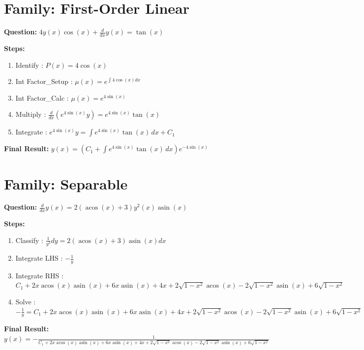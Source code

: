 \documentclass{article}
\begin{document}
\section*{Family: First-Order Linear}
\textbf{Question:} $4 y{\left(x \right)} \cos{\left(x \right)} + \frac{d}{d x} y{\left(x \right)} = \tan{\left(x \right)}$

\textbf{Steps:}
\begin{enumerate}
\item Identify :  $P(x) = 4 \cos{\left(x \right)}$
\item Int Factor_Setup :  $\mu(x) = e^{\int 4 \cos{\left(x \right)} dx}$
\item Int Factor_Calc :  $\mu(x) = e^{4 \sin{\left(x \right)}}$
\item Multiply :  $\frac{d}{dx}(e^{4 \sin{\left(x \right)}}y) = e^{4 \sin{\left(x \right)}} \tan{\left(x \right)}$
\item Integrate :  $e^{4 \sin{\left(x \right)}}y = \int e^{4 \sin{\left(x \right)}} \tan{\left(x \right)}\, dx + C_1$
\end{enumerate}
\textbf{Final Result:} $y{\left(x \right)} = \left(C_{1} + \int e^{4 \sin{\left(x \right)}} \tan{\left(x \right)}\, dx\right) e^{- 4 \sin{\left(x \right)}}$

\section*{Family: Separable}
\textbf{Question:} $\frac{d}{d x} y{\left(x \right)} = 2 \left(\operatorname{acos}{\left(x \right)} + 3\right) y^{2}{\left(x \right)} \operatorname{asin}{\left(x \right)}$

\textbf{Steps:}
\begin{enumerate}
\item Classify :  $\frac{1}{y^{2}} dy = 2 \left(\operatorname{acos}{\left(x \right)} + 3\right) \operatorname{asin}{\left(x \right)} dx$
\item Integrate LHS :  $- \frac{1}{y}$
\item Integrate RHS :  $C_{1} + 2 x \operatorname{acos}{\left(x \right)} \operatorname{asin}{\left(x \right)} + 6 x \operatorname{asin}{\left(x \right)} + 4 x + 2 \sqrt{1 - x^{2}} \operatorname{acos}{\left(x \right)} - 2 \sqrt{1 - x^{2}} \operatorname{asin}{\left(x \right)} + 6 \sqrt{1 - x^{2}}$
\item Solve :  $- \frac{1}{y} = C_{1} + 2 x \operatorname{acos}{\left(x \right)} \operatorname{asin}{\left(x \right)} + 6 x \operatorname{asin}{\left(x \right)} + 4 x + 2 \sqrt{1 - x^{2}} \operatorname{acos}{\left(x \right)} - 2 \sqrt{1 - x^{2}} \operatorname{asin}{\left(x \right)} + 6 \sqrt{1 - x^{2}}$
\end{enumerate}
\textbf{Final Result:} $y{\left(x \right)} = - \frac{1}{C_{1} + 2 x \operatorname{acos}{\left(x \right)} \operatorname{asin}{\left(x \right)} + 6 x \operatorname{asin}{\left(x \right)} + 4 x + 2 \sqrt{1 - x^{2}} \operatorname{acos}{\left(x \right)} - 2 \sqrt{1 - x^{2}} \operatorname{asin}{\left(x \right)} + 6 \sqrt{1 - x^{2}}}$
\end{document}
